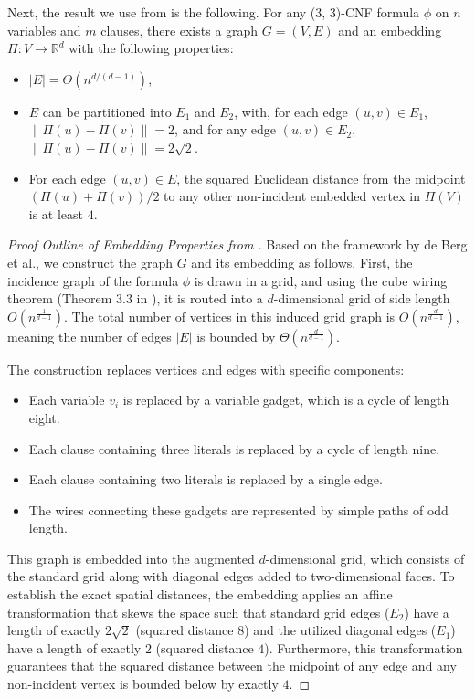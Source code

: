 Next, the result we use from \cite{BergBKMZ20} is the following. For any (3, 3)-CNF formula $\phi$ on $n$ variables and $m$ clauses, there exists a graph $G = (V,E)$ and an embedding $\Pi : V \rightarrow \mathbb{R}^d$ with the following properties:
\begin{itemize}
    \item $|E| = \Theta(n^{d/(d-1)})$, 
    \item $E$ can be partitioned into $E_1$ and $E_2$, with, for each edge $(u,v) \in E_1$, $\|\Pi(u) - \Pi(v)\| = 2$, and for any edge $(u, v) \in E_2$, $\|\Pi(u) - \Pi(v)\| = 2\sqrt{2}$.
    \item For each edge $(u,v) \in E$, the squared Euclidean distance from the midpoint $(\Pi(u) + \Pi(v))/2$ to any other non-incident embedded vertex in $\Pi(V)$ is at least $4$.
\end{itemize}

\begin{proof}[Proof Outline of Embedding Properties from \cite{BergBKMZ20}] 
Based on the framework by de Berg et al., we construct the graph $G$ and its embedding as follows. First, the incidence graph of the formula $\phi$ is drawn in a grid, and using the cube wiring theorem (Theorem 3.3 in \cite{BergBKMZ20}), it is routed into a $d$-dimensional grid of side length $O(n^{\frac{1}{d-1}})$. The total number of vertices in this induced grid graph is $O(n^{\frac{d}{d-1}})$, meaning the number of edges $|E|$ is bounded by $\Theta(n^{\frac{d}{d-1}})$. 

The construction replaces vertices and edges with specific components:
\begin{itemize}
    \item Each variable $v_i$ is replaced by a variable gadget, which is a cycle of length eight.
    \item Each clause containing three literals is replaced by a cycle of length nine.
    \item Each clause containing two literals is replaced by a single edge.
    \item The wires connecting these gadgets are represented by simple paths of odd length.
\end{itemize}

This graph is embedded into the augmented $d$-dimensional grid, which consists of the standard grid along with diagonal edges added to two-dimensional faces. To establish the exact spatial distances, the embedding applies an affine transformation that skews the space such that standard grid edges ($E_2$) have a length of exactly $2\sqrt{2}$ (squared distance $8$) and the utilized diagonal edges ($E_1$) have a length of exactly $2$ (squared distance $4$). Furthermore, this transformation guarantees that the squared distance between the midpoint of any edge and any non-incident vertex is bounded below by exactly $4$.
\end{proof}

